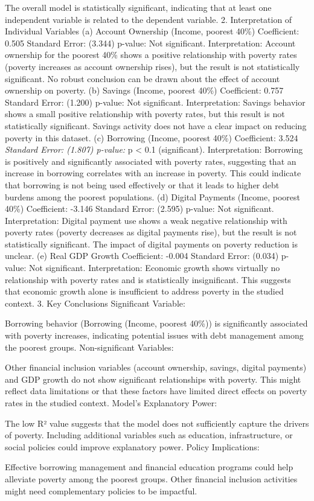 \documentclass[
]{article}
\begin{document}
The overall model is statistically significant, indicating that at least
one independent variable is related to the dependent variable. 2.
Interpretation of Individual Variables (a) Account Ownership (Income,
poorest 40\%) Coefficient: 0.505 Standard Error: (3.344) p-value: Not
significant. Interpretation: Account ownership for the poorest 40\%
shows a positive relationship with poverty rates (poverty increases as
account ownership rises), but the result is not statistically
significant. No robust conclusion can be drawn about the effect of
account ownership on poverty. (b) Savings (Income, poorest 40\%)
Coefficient: 0.757 Standard Error: (1.200) p-value: Not significant.
Interpretation: Savings behavior shows a small positive relationship
with poverty rates, but this result is not statistically significant.
Savings activity does not have a clear impact on reducing poverty in
this dataset. (c) Borrowing (Income, poorest 40\%) Coefficient:
3.524\emph{ Standard Error: (1.807) p-value: }p \textless{} 0.1
(significant). Interpretation: Borrowing is positively and significantly
associated with poverty rates, suggesting that an increase in borrowing
correlates with an increase in poverty. This could indicate that
borrowing is not being used effectively or that it leads to higher debt
burdens among the poorest populations. (d) Digital Payments (Income,
poorest 40\%) Coefficient: -3.146 Standard Error: (2.595) p-value: Not
significant. Interpretation: Digital payment use shows a weak negative
relationship with poverty rates (poverty decreases as digital payments
rise), but the result is not statistically significant. The impact of
digital payments on poverty reduction is unclear. (e) Real GDP Growth
Coefficient: -0.004 Standard Error: (0.034) p-value: Not significant.
Interpretation: Economic growth shows virtually no relationship with
poverty rates and is statistically insignificant. This suggests that
economic growth alone is insufficient to address poverty in the studied
context. 3. Key Conclusions Significant Variable:

Borrowing behavior (Borrowing (Income, poorest 40\%)) is significantly
associated with poverty increases, indicating potential issues with debt
management among the poorest groups. Non-significant Variables:

Other financial inclusion variables (account ownership, savings, digital
payments) and GDP growth do not show significant relationships with
poverty. This might reflect data limitations or that these factors have
limited direct effects on poverty rates in the studied context. Model's
Explanatory Power:

The low R² value suggests that the model does not sufficiently capture
the drivers of poverty. Including additional variables such as
education, infrastructure, or social policies could improve explanatory
power. Policy Implications:

Effective borrowing management and financial education programs could
help alleviate poverty among the poorest groups. Other financial
inclusion activities might need complementary policies to be impactful.
\end{document}
